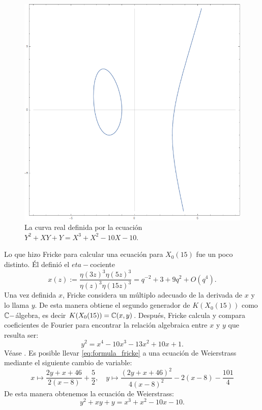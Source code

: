 \documentclass[../../tesis_maestria]{subfiles}
\begin{document}
\begin{figure}[!h]%
  \centering
  \includegraphics[scale=0.3]{figuras/eq_weierstrass}
  \caption{La curva real definida por la ecuación $Y^2+XY+Y=X^3+X^2-10X-10$.}
  \label{fig:eq_weierstrass}
\end{figure}%

\begin{nota}
Lo que hizo Fricke para calcular una ecuación para $X_0(15)$ fue un poco distinto. Él definió el $eta-$cociente
\begin{equation}\label{eq:def_x_fricke}
	x(z):=
	\frac{\eta(3z)^3\eta(5z)^3}{\eta(z)^3\eta(15z)^3}=
	q^{-2}+3+9q^2+O(q^4).
\end{equation}
Una vez definida $x$, Fricke considera un múltiplo adecuado de la derivada de $x$ y lo llama $y$. De esta manera obtiene el segundo generador de $K(X_0(15))$ como $\mathbb{C}-$álgebra, es decir $K(X_0(15))=\mathbb{C}(x,y)$. Después, Fricke calcula y compara coeficientes de Fourier para encontrar la relación algebraica entre $x$ y $y$ que resulta ser:
\begin{equation}\label{eq:formula_fricke}
		y^2=x^4-10x^3-13x^2+10x+1.
\end{equation}
Véase \cite[página 439]{Fricke}. Es posible llevar \eqref{eq:formula_fricke} a una ecuación de Weierstrass mediante el siguiente cambio de variable:
	\[
		x\mapsto \frac{2y+x+46}{2(x-8)}+\frac{5}{2},\quad
		y\mapsto \frac{(2y+x+46)^2}{4(x-8)^2}-2(x-8)-\frac{101}{4}
	\]
De esta manera obtenemos la ecuación de Weierstrass:
	\begin{equation}\label{eq:relacionweierstrass}
		y^2+xy+y=x^3+x^2-10x-10.
	\end{equation}
\end{nota}
\end{document}
